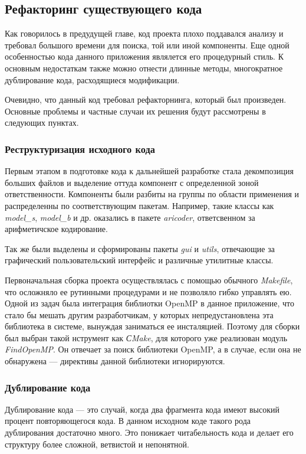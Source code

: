 \documentclass{matmex-diploma-custom}
\begin{document}
\subsection{Рефакторинг существующего кода}
Как говорилось в предудущей главе, код проекта плохо поддавался анализу и требовал большого времени для поиска, той или иной компоненты. Еще одной особенностью кода данного приложения являлется его процедурный стиль. К основным недостаткам также можно отнести длинные методы, многократное дублирование кода, расходящиеся модификации.

Очевидно, что данный код требовал рефакторнинга, который был произведен. Основные проблемы и частные случаи их  решения будут рассмотрены в следующих пунктах.

\subsubsection{Реструктуризация исходного кода}
Первым этапом в  подготовке кода к дальнейшей разработке стала декомпозиция больших файлов и выделение оттуда компонент с определенной зоной ответственности. Компоненты  были разбиты на группы по области применения и распределенны по соответствующим пакетам. Например, такие классы как \emph{model\_s}, \emph{model\_b} и др. оказались в пакете \emph{aricoder}, ответсвенном за арифметичское кодирование.

Так же были выделены и сформированы пакеты \emph{gui} и \emph{utils}, отвечающие за графический пользовательский интерфейс и различные утилитные классы.

Первоначальная сборка проекта осуществлялась с помощью обычного \emph{Makefile}, что осложняло ее рутинными процедурами и не позволяло гибко управлять ею. Одной из задач была интеграция библиотки OpenMP в данное приложение, что стало бы мешать другим разработчикам, у которых непредустановлена эта библиотека в системе, вынуждая заниматься ее инсталяцией. Поэтому для сборки был выбран такой нструмент как \emph{СMake}, для которого уже реализован модуль \emph{FindOpenMP}. Он отвечает за поиск библиотеки OpenMP, а в случае, если она не обнаружена --- директивы данной библиотеки игнорируются.

\subsubsection{Дублирование кода}
Дублирование кода --- это случай, когда два фрагмента кода имеют высокий процент повторяющегося кода. В данном исходном коде такого рода дублирования достаточно много. Это понижает читабельность кода и делает его структуру более сложной, ветвистой и непонятной.
\end{document}
